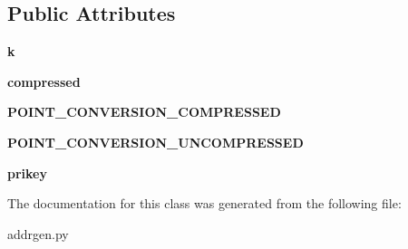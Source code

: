 \subsection*{\-Public \-Attributes}
\begin{DoxyCompactItemize}
\item 
\hypertarget{classaddrgen_1_1KEY_a6fe39db707461511b7dbad7ed988c1e5}{{\bfseries k}}\label{classaddrgen_1_1KEY_a6fe39db707461511b7dbad7ed988c1e5}

\item 
\hypertarget{classaddrgen_1_1KEY_ac14c82cb07966d41b6b3fd769a76d583}{{\bfseries compressed}}\label{classaddrgen_1_1KEY_ac14c82cb07966d41b6b3fd769a76d583}

\item 
\hypertarget{classaddrgen_1_1KEY_a109c9369b69d5ad84a17260616720c8e}{{\bfseries \-P\-O\-I\-N\-T\-\_\-\-C\-O\-N\-V\-E\-R\-S\-I\-O\-N\-\_\-\-C\-O\-M\-P\-R\-E\-S\-S\-E\-D}}\label{classaddrgen_1_1KEY_a109c9369b69d5ad84a17260616720c8e}

\item 
\hypertarget{classaddrgen_1_1KEY_a0c0f67b6ea134ba22adfe2fb3bcfe268}{{\bfseries \-P\-O\-I\-N\-T\-\_\-\-C\-O\-N\-V\-E\-R\-S\-I\-O\-N\-\_\-\-U\-N\-C\-O\-M\-P\-R\-E\-S\-S\-E\-D}}\label{classaddrgen_1_1KEY_a0c0f67b6ea134ba22adfe2fb3bcfe268}

\item 
\hypertarget{classaddrgen_1_1KEY_a96fa682e0d6dd827952b1f239494771f}{{\bfseries prikey}}\label{classaddrgen_1_1KEY_a96fa682e0d6dd827952b1f239494771f}

\end{DoxyCompactItemize}


\-The documentation for this class was generated from the following file\-:\begin{DoxyCompactItemize}
\item 
addrgen.\-py\end{DoxyCompactItemize}
